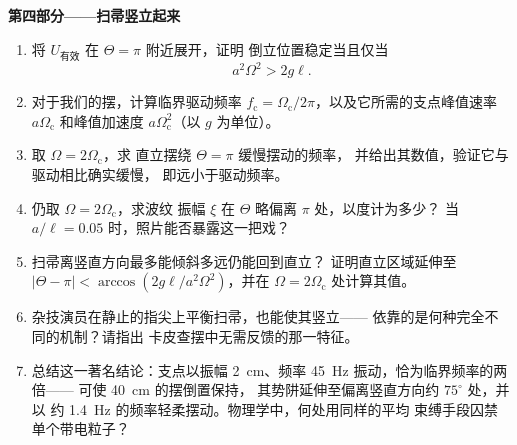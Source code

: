 \begin{problem}
\medskip\noindent\textbf{第四部分——扫帚竖立起来}
\begin{enumerate}[resume]
  \item 将 $U_{\text{有效}}$ 在 $\Theta = \pi$ 附近展开，证明
        倒立位置稳定当且仅当
        \[
        a^2\Omega^2 > 2g\ell .
        \]
  \item 对于我们的摆，计算临界驱动频率 $f_{\text{c}} =
        \Omega_{\text{c}}/2\pi$，以及它所需的支点峰值速率
        $a\Omega_{\text{c}}$ 和峰值加速度
        $a\Omega_{\text{c}}^2$（以 $g$ 为单位）。
  \item 取 $\Omega = 2\Omega_{\text{c}}$，求
        直立摆绕 $\Theta = \pi$ 缓慢摆动的频率，
        并给出其数值，验证它与驱动相比确实缓慢，
        即远小于驱动频率。
  \item 仍取 $\Omega = 2\Omega_{\text{c}}$，求波纹
        振幅 $\xi$ 在 $\Theta$ 略偏离 $\pi$ 处，以度计为多少？
        当 $a/\ell = 0.05$ 时，照片能否暴露这一把戏？
  \item 扫帚离竖直方向最多能倾斜多远仍能回到直立？
        证明直立区域延伸至 $|\Theta - \pi| <
        \arccos(2g\ell/a^2\Omega^2)$，并在 $\Omega =
        2\Omega_{\text{c}}$ 处计算其值。
  \item 杂技演员在静止的指尖上平衡扫帚，也能使其竖立——
        依靠的是何种完全不同的机制？请指出
        卡皮查摆中无需反馈的那一特征。
  \item 总结这一著名结论：支点以振幅
        \qty{2}{cm}、频率 \qty{45}{Hz} 振动，恰为临界频率的两倍——
        可使 \qty{40}{cm} 的摆倒置保持，
        其势阱延伸至偏离竖直方向约 $75^\circ$ 处，并以
        约 \qty{1.4}{Hz} 的频率轻柔摆动。物理学中，何处用同样的平均
        束缚手段囚禁单个带电粒子？
\end{enumerate}
\end{problem}
